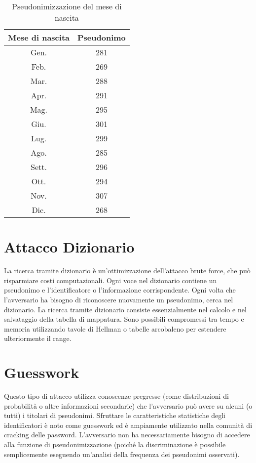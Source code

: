 \begin{table}[h]
\centering
\begin{tabular}{|c|c|}
\hline
Mese di nascita & Pseudonimo \\
\hline
Gen. & 281 \\
Feb. & 269 \\
Mar. & 288 \\
Apr. & 291 \\
Mag. & 295 \\
Giu. & 301 \\
Lug. & 299 \\
Ago. & 285 \\
Sett. & 296 \\
Ott. & 294 \\
Nov. & 307 \\
Dic. & 268 \\
\hline
\end{tabular}
\caption{Pseudonimizzazione del mese di nascita}
\end{table}

\section{Attacco Dizionario}
La ricerca tramite dizionario è un'ottimizzazione dell'attacco brute force, che può risparmiare costi computazionali. 
Ogni voce nel dizionario contiene un pseudonimo e l'identificatore o l'informazione corrispondente. Ogni volta che l'avversario ha bisogno di riconoscere nuovamente un pseudonimo, cerca nel dizionario. 
La ricerca tramite dizionario consiste essenzialmente nel calcolo e nel salvataggio della tabella di mappatura. Sono possibili compromessi tra tempo e memoria utilizzando tavole di Hellman o tabelle arcobaleno per estendere ulteriormente il range. 

\section{Guesswork}

Questo tipo di attacco utilizza conoscenze pregresse (come distribuzioni di probabilità o altre informazioni secondarie) che l'avversario può avere su alcuni (o tutti) i titolari di pseudonimi.
Sfruttare le caratteristiche statistiche degli identificatori è noto come guesswork ed è ampiamente utilizzato nella comunità di cracking delle password. 
L'avversario non ha necessariamente bisogno di accedere alla funzione di pseudonimizzazione (poiché la discriminazione è possibile semplicemente eseguendo un'analisi della frequenza dei pseudonimi osservati).

